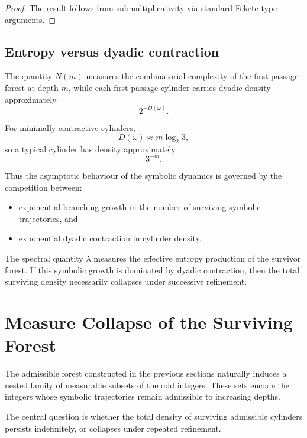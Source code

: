 \documentclass[12pt, oneside]{article}
\numberwithin{equation}{section}
\theoremstyle{definition}
\theoremstyle{plain}
\theoremstyle{remark}
\begin{document}
\begin{proof}
The result follows from submultiplicativity via standard
Fekete-type arguments.
\end{proof}

\subsection{Entropy versus dyadic contraction}

The quantity \(N(m)\) measures the combinatorial complexity of the
first-passage forest at depth \(m\), while each first-passage
cylinder carries dyadic density approximately
\[
2^{-D(\omega)}.
\]

For minimally contractive cylinders,
\[
D(\omega)\approx m\log_2 3,
\]
so a typical cylinder has density approximately
\[
3^{-m}.
\]

Thus the asymptotic behaviour of the symbolic dynamics is governed
by the competition between:
\begin{itemize}
\item exponential branching growth in the number of surviving
symbolic trajectories, and
\item exponential dyadic contraction in cylinder density.
\end{itemize}

The spectral quantity \(\lambda\) measures the effective entropy
production of the survivor forest. If this symbolic growth is
dominated by dyadic contraction, then the total surviving density
necessarily collapses under successive refinement.

\section{Measure Collapse of the Surviving Forest}
\label{sec:measure-collapse}

The admissible forest constructed in the previous sections naturally
induces a nested family of measurable subsets of the odd integers.
These sets encode the integers whose symbolic trajectories remain
admissible to increasing depths.

The central question is whether the total density of surviving
admissible cylinders persists indefinitely, or collapses under repeated
refinement.

\end{document}
